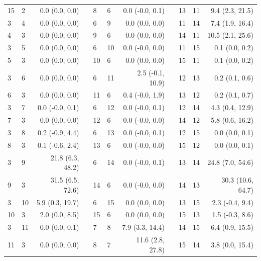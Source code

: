 \begin{xltabular}{\textwidth}{llrp{0.2cm}llrp{0.2cm}llr}
    15 & 2 & 0.0 (0.0, 0.0) & & 8 & 6 & 0.0 (-0.0, 0.1) & & 13 & 11 & 9.4 (2.3, 21.5) \\
    3 & 4 & 0.0 (0.0, 0.0) & & 6 & 9 & 0.0 (0.0, 0.0) & & 11 & 14 & 7.4 (1.9, 16.4) \\
    4 & 3 & 0.0 (0.0, 0.0) & & 9 & 6 & 0.0 (0.0, 0.0) & & 14 & 11 & 10.5 (2.1, 25.6) \\
    3 & 5 & 0.0 (0.0, 0.0) & & 6 & 10 & 0.0 (-0.0, 0.0) & & 11 & 15 & 0.1 (0.0, 0.2) \\
    5 & 3 & 0.0 (0.0, 0.0) & & 10 & 6 & 0.0 (0.0, 0.0) & & 15 & 11 & 0.1 (0.0, 0.2) \\
    3 & 6 & 0.0 (0.0, 0.0) & & 6 & 11 & 2.5 (-0.1, 10.9) & & 12 & 13 & 0.2 (0.1, 0.6) \\
    6 & 3 & 0.0 (0.0, 0.0) & & 11 & 6 & 0.4 (-0.0, 1.9) & & 13 & 12 & 0.2 (0.1, 0.7) \\
    3 & 7 & 0.0 (-0.0, 0.1) & & 6 & 12 & 0.0 (-0.0, 0.1) & & 12 & 14 & 4.3 (0.4, 12.9) \\
    7 & 3 & 0.0 (0.0, 0.0) & & 12 & 6 & 0.0 (-0.0, 0.0) & & 14 & 12 & 5.8 (0.6, 16.2) \\
    3 & 8 & 0.2 (-0.9, 4.4) & & 6 & 13 & 0.0 (-0.0, 0.1) & & 12 & 15 & 0.0 (0.0, 0.1) \\
    8 & 3 & 0.1 (-0.6, 2.4) & & 13 & 6 & 0.0 (-0.0, 0.0) & & 15 & 12 & 0.0 (0.0, 0.1) \\
    3 & 9 & 21.8 (6.3, 48.2) & & 6 & 14 & 0.0 (-0.0, 0.1) & & 13 & 14 & 24.8 (7.0, 54.6) \\
    9 & 3 & 31.5 (6.5, 72.6) & & 14 & 6 & 0.0 (-0.0, 0.0) & & 14 & 13 & 30.3 (10.6, 64.7) \\
    3 & 10 & 5.9 (0.3, 19.7) & & 6 & 15 & 0.0 (0.0, 0.0) & & 13 & 15 & 2.3 (-0.4, 9.4) \\
    10 & 3 & 2.0 (0.0, 8.5) & & 15 & 6 & 0.0 (0.0, 0.0) & & 15 & 13 & 1.5 (-0.3, 8.6) \\
    3 & 11 & 0.0 (0.0, 0.1) & & 7 & 8 & 7.9 (3.3, 14.4) & & 14 & 15 & 6.4 (0.9, 15.5) \\
    11 & 3 & 0.0 (0.0, 0.0) & & 8 & 7 & 11.6 (2.8, 27.8) & & 15 & 14 & 3.8 (0.0, 15.4) \\
    \bottomrule
\end{xltabular}

